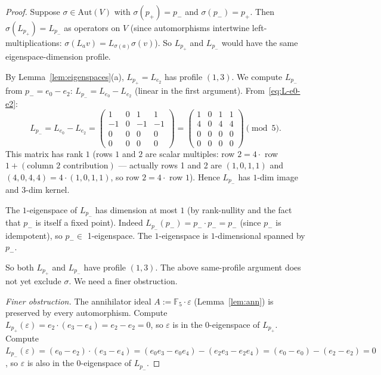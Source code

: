 \documentclass[11pt,reqno]{amsart}
\theoremstyle{plain}
\theoremstyle{definition}
\theoremstyle{remark}
\newcommand{\F}{\mathbb{F}}
\newcommand{\Aut}{\mathrm{Aut}}
\begin{document}
\begin{proof}
Suppose $\sigma \in \Aut(V)$ with $\sigma(p_+) = p_-$ and $\sigma(p_-) = p_+$. Then $\sigma(L_{p_+}) = L_{p_-}$ as operators on $V$ (since automorphisms intertwine left-multiplications: $\sigma(L_a v) = L_{\sigma(a)} \sigma(v)$). So $L_{p_+}$ and $L_{p_-}$ would have the same eigenspace-dimension profile.

By Lemma~\ref{lem:eigenspaces}(a), $L_{p_+} = L_{e_2}$ has profile $(1, 3)$. We compute $L_{p_-}$ from $p_- = e_0 - e_2$: $L_{p_-} = L_{e_0} - L_{e_2}$ (linear in the first argument). From~\eqref{eq:L-e0-e2}:
\[
L_{p_-} = L_{e_0} - L_{e_2} = \begin{pmatrix}
1 & 0 & 1 & 1 \\
-1 & 0 & -1 & -1 \\
0 & 0 & 0 & 0 \\
0 & 0 & 0 & 0
\end{pmatrix} = \begin{pmatrix}
1 & 0 & 1 & 1 \\
4 & 0 & 4 & 4 \\
0 & 0 & 0 & 0 \\
0 & 0 & 0 & 0
\end{pmatrix} \pmod 5.
\]
This matrix has rank $1$ (rows $1$ and $2$ are scalar multiples: row $2 = 4 \cdot$ row $1 + (\text{column 2 contribution})$ — actually rows 1 and 2 are $(1, 0, 1, 1)$ and $(4, 0, 4, 4) = 4 \cdot (1, 0, 1, 1)$, so row $2 = 4 \cdot$ row $1$). Hence $L_{p_-}$ has $1$-dim image and $3$-dim kernel.

The $1$-eigenspace of $L_{p_-}$ has dimension at most $1$ (by rank-nullity and the fact that $p_-$ is itself a fixed point). Indeed $L_{p_-}(p_-) = p_- \cdot p_-= p_-$ (since $p_-$ is idempotent), so $p_- \in $ 1-eigenspace. The $1$-eigenspace is $1$-dimensional spanned by $p_-$.

So both $L_{p_+}$ and $L_{p_-}$ have profile $(1, 3)$. The above same-profile argument does not yet exclude $\sigma$. We need a finer obstruction.

\emph{Finer obstruction.} The annihilator ideal $A := \F_5 \cdot \varepsilon$ (Lemma~\ref{lem:ann}) is preserved by every automorphism. Compute $L_{p_+}(\varepsilon) = e_2 \cdot (e_3 - e_4) = e_2 - e_2 = 0$, so $\varepsilon$ is in the $0$-eigenspace of $L_{p_+}$. Compute $L_{p_-}(\varepsilon) = (e_0 - e_2) \cdot (e_3 - e_4) = (e_0 e_3 - e_0 e_4) - (e_2 e_3 - e_2 e_4) = (e_0 - e_0) - (e_2 - e_2) = 0$, so $\varepsilon$ is also in the $0$-eigenspace of $L_{p_-}$.


\end{proof}
\end{document}
